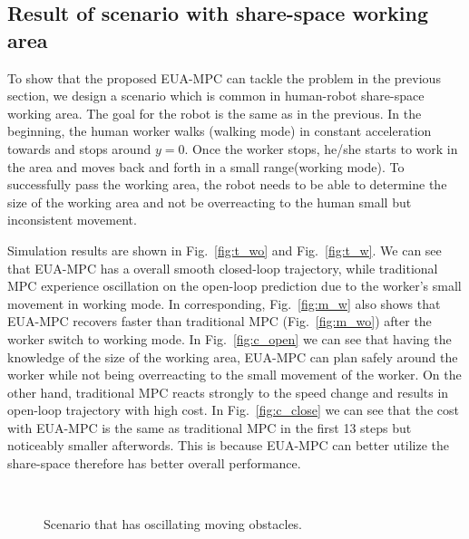 \documentclass[letterpaper, 10 pt, conference]{ieeeconf}  %
\begin{document}

\subsection{Result of scenario with share-space working area}

To show that the proposed EUA-MPC can tackle the problem in the previous section, we design a scenario which is common in human-robot share-space working area. The goal for the robot is the same as in the previous. In the beginning, the human worker walks (walking mode) in constant acceleration towards and stops around $y=0$. Once the worker stops, he/she starts to work in the area and moves back and forth in a small range(working mode). To successfully pass the working area, the robot needs to be able to determine the size of the working area and not be overreacting to the human small but inconsistent movement. 

Simulation results are shown in Fig.~\ref{fig:t_wo} and Fig.~\ref{fig:t_w}. We can see that EUA-MPC has a overall smooth closed-loop trajectory, while traditional MPC experience oscillation on the open-loop prediction due to the worker's small movement in working mode. In corresponding, Fig.~\ref{fig:m_w} also shows that EUA-MPC recovers faster than traditional MPC (Fig.~\ref{fig:m_wo}) after the worker switch to working mode. In Fig.~\ref{fig:c_open} we can see that having the knowledge of the size of the working area, EUA-MPC can plan safely around the worker while not being overreacting to the small movement of the worker. On the other hand, traditional MPC reacts strongly to the speed change and results in open-loop trajectory with high cost. In Fig.~\ref{fig:c_close} we can see that the cost with EUA-MPC is the same as traditional MPC in the first 13 steps but noticeably smaller afterwords. This is because EUA-MPC can better utilize the share-space therefore has better overall performance.
\begin{figure}[t]
      \centering
      \\
      
      \caption{Scenario that has oscillating moving obstacles.}      
\end{figure}
\end{document}
